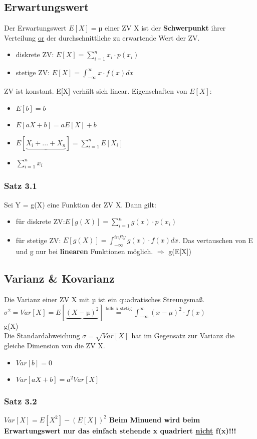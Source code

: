 \subsection{Erwartungswert}
Der Erwartungswert $E[X] = µ$ einer ZV X ist der \textbf{Schwerpunkt} ihrer Verteilung \underline{or} der durchschnittliche zu erwartende Wert der ZV.
\begin{itemize}
  \item diskrete ZV: $E[X] = \sum_{i=1}^{n} x_{i} \cdot p(x_{i})$
  \item stetige ZV: $E[X] = \int_{-\infty}^{\infty} x \cdot f(x) dx$
\end{itemize}
ZV ist konstant. E[X] verhält sich linear. Eigenschaften von $E[X]$:
\begin{itemize}
  \item $E[b] = b$
  \item $E[aX + b] = aE[X] + b$
  \item $E[\underbrace{X_{i} + ... + X_{n}}] = \sum_{i=1}^{n} E[X_{i}]$
  \item $\sum_{i=1}^{n} x_{i}$
\end{itemize}
\subsubsection{Satz 3.1}
Sei Y = g(X) eine Funktion der ZV X. Dann gilt:
\begin{itemize}
  \item für diskrete ZV:$E[g(X)] = \sum_{i=1}^{n} g(x) \cdot p(x_ {i})$
  \item für stetige ZV: $E[g(X)] = \int_{-\infty}^{infty} g(x) \cdot f(x) dx$. Das vertauschen von E und g nur bei \textbf{linearen} Funktionen möglich. $\Rightarrow$ g(E[X])
\end{itemize}
\subsection{Varianz \& Kovarianz}
Die Varianz einer ZV X mit µ ist ein quadratisches Streungsmaß. $\sigma^2 = Var[X] = E[\underbrace{(X - µ)^2}] \stackrel{\text{falls x stetig}}{=} \int_{-\infty}^{\infty} (x-\mu)^2 \cdot f(x)$\\
g(X)\\
Die Standardabweichung $\sigma = \sqrt{Var[X]}$ hat im Gegensatz zur Varianz die gleiche Dimension von die ZV X.
\begin{itemize}
  \item $Var[b] = 0$
  \item $Var[aX + b] = a^2 Var[X]$
\end{itemize}
\subsubsection{Satz 3.2}
$Var[X] = E[X^2] - (E[X])^2$ \textbf{Beim Minuend wird beim Erwartungswert nur das einfach stehende x quadriert \underline{nicht} f(x)!!!}
